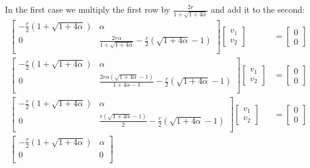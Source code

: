\documentclass{article}
\begin{document}
\begin{solution}
In the first case we multiply the first row by 
$ \frac{2r}{ 1 + \sqrt{1+4\alpha} } $
and add it to the second:
\begin{align*}
\begin{bmatrix}
-\frac{r}{2} \left( 1 + \sqrt{1 + 4\alpha}\right)	&	\alpha		\\
0													&	\frac{2r\alpha}{ 1 + \sqrt{1+4\alpha} }-\frac{r}{2}\left( \sqrt{1 + 4\alpha} - 1\right)	\\
\end{bmatrix}
\begin{bmatrix}
v_{1}\\
v_{2}
\end{bmatrix}
&=
\begin{bmatrix}
0\\
0
\end{bmatrix}
\\
\begin{bmatrix}
-\frac{r}{2} \left( 1 + \sqrt{1 + 4\alpha}\right)	&	\alpha		\\
0													&	\frac{2r\alpha \left( \sqrt{1+4\alpha} -1 \right) }{ 1 + 4\alpha - 1 }-\frac{r}{2}\left( \sqrt{1 + 4\alpha} - 1\right)	\\
\end{bmatrix}
\begin{bmatrix}
v_{1}\\
v_{2}
\end{bmatrix}
&=
\begin{bmatrix}
0\\
0
\end{bmatrix}
\\
\begin{bmatrix}
-\frac{r}{2} \left( 1 + \sqrt{1 + 4\alpha}\right)	&	\alpha		\\
0													&	\frac{r \left( \sqrt{1+4\alpha} -1 \right) }{ 2 }-\frac{r}{2}\left( \sqrt{1 + 4\alpha} - 1\right)	\\
\end{bmatrix}
\begin{bmatrix}
v_{1}\\
v_{2}
\end{bmatrix}
&=
\begin{bmatrix}
0\\
0
\end{bmatrix}
\\
\begin{bmatrix}
-\frac{r}{2} \left( 1 + \sqrt{1 + 4\alpha}\right)	&	\alpha		\\
0													&	0	\\

\end{bmatrix}
\end{align*}
\end{solution}
\end{document}
